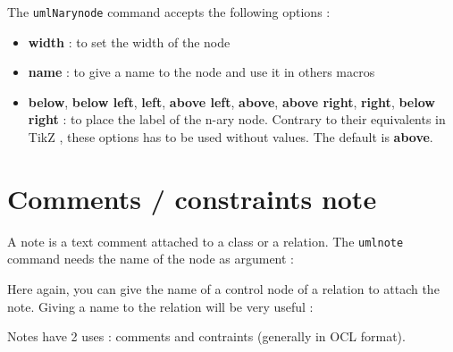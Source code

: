 \documentclass[a4paper,11pt]{report}
\newcommand{\inputTikZ}[1]{%
  }%
\newcommand{\inputTikZ}[1]{%
    \texttt{[image: fig/\#1.pdf]}%
  }%
\newcommand{\TikZ}{{\sc TikZ} \xspace}
\begin{document}
The {\tt umlNarynode} command accepts the following options :

\begin{itemize}
\item {\bf width} : to set the width of the node
\item {\bf name} : to give a name to the node and use it in others macros
\item {\bf below}, {\bf below left}, {\bf left}, {\bf above left}, {\bf above}, {\bf above right}, {\bf right}, {\bf below right} : to place the label of the n-ary node. Contrary to their equivalents in \TikZ, these options has to be used without values. The default is {\bf above}.
\end{itemize}

\section{Comments / constraints note}\label{s.note}

A note is a text comment attached to a class or a relation. The {\tt umlnote} command needs the name of the node as argument :

\medskip

\begin{minipage}{0.5\textwidth}

\end{minipage}
\begin{minipage}{0.4\textwidth}
\begin{center}
\inputTikZ{noteclass}
\end{center}
\end{minipage}

\medskip

Here again, you can give the name of a control node of a relation to attach the note. Giving a name to the relation will be very useful :

\medskip

\begin{minipage}{0.6\textwidth}

\end{minipage}
\begin{minipage}{0.4\textwidth}
\begin{center}
\inputTikZ{noterelation}
\end{center}
\end{minipage}

\medskip

\medskip

Notes have 2 uses : comments and contraints (generally in OCL format).
\end{document}
